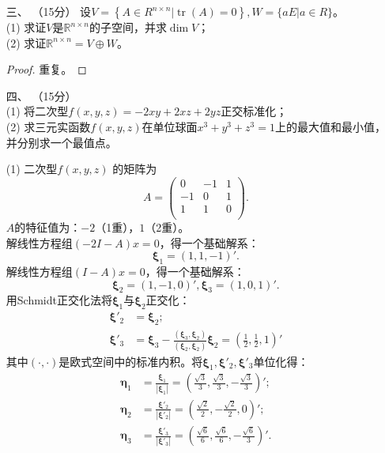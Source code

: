 \begin{enumerate}[1~]
\item[三、]（15分）
设$V = \left\{ A \in R ^ { n \times n } | \operatorname { tr } ( A ) = 0 \right\} , W = \{ a E | a \in R \}$。\\
(1) 求证$V$是$\mathbb{R}^{n\times n}$的子空间，并求$\dim V$；\\
(2) 求证$\mathbb{R} ^ { n \times n } = V \oplus W$。
\begin{proof}
重复。
\end{proof}

\item[四、]（15分）\\
(1) 将二次型$f ( x , y , z ) = - 2 x y + 2 x z + 2 y z$正交标准化；\\
(2) 求三元实函数$f(x, y, z)$在单位球面$x ^ { 3 } + y ^ { 3 } + z ^ { 3 } = 1$上的最大值和最小值，并分别求一个最值点。
\begin{solution}
(1) 二次型$f ( x , y , z )$ 的矩阵为\[
A=\left( \begin{matrix}
	0&		-1&		1\\
	-1&		0&		1\\
	1&		1&		0\\
\end{matrix} \right) .
\]
$A$的特征值为：$-2$（1重），$1$（2重）。\\
解线性方程组$(-2I-A)x=0$，得一个基础解系：\[
\boldsymbol{\xi}_1=(1, 1, -1)'.
\]
解线性方程组$(I-A)x=0$，得一个基础解系：\[
\boldsymbol{\xi}_2=(1, -1, 0)', \boldsymbol{\xi}_3=(1, 0, 1)'.
\]
用Schmidt正交化法将$\boldsymbol{\xi}_1$与$\boldsymbol{\xi}_2$正交化：\begin{align*}
\boldsymbol{\xi}'_2&=\boldsymbol{\xi}_2;\\
\boldsymbol{\xi}'_3&=\boldsymbol{\xi}_3-\frac{(\boldsymbol{\xi}_3, \boldsymbol{\xi}_2)}{(\boldsymbol{\xi}_2, \boldsymbol{\xi}_2)} \boldsymbol{\xi}_2=\left(\frac12, \frac12, 1\right)'
\end{align*}
其中$(\cdot, \cdot)$是欧式空间中的标准内积。将$\boldsymbol{\xi}_1, \boldsymbol{\xi}'_2, \boldsymbol{\xi}'_3$单位化得：
\begin{align*}
\boldsymbol{\eta}_1&=\frac{\boldsymbol{\xi}_1}{|\boldsymbol{\xi}_1|}=\left(\frac{\sqrt{3}}{3}, \frac{\sqrt{3}}{3}, -\frac{\sqrt{3}}{3}\right)';\\
\boldsymbol{\eta}_2&=\frac{\boldsymbol{\xi}'_2}{|\boldsymbol{\xi}'_2|}=\left(\frac{\sqrt{2}}{2}, -\frac{\sqrt{2}}{2}, 0\right)';\\
\boldsymbol{\eta}_3&=\frac{\boldsymbol{\xi}'_3}{|\boldsymbol{\xi}'_3|}=\left(\frac{\sqrt{6}}{6}, \frac{\sqrt{6}}{6}, -\frac{\sqrt{6}}{3}\right)'.

\end{align*}
\end{solution}
\end{enumerate}
